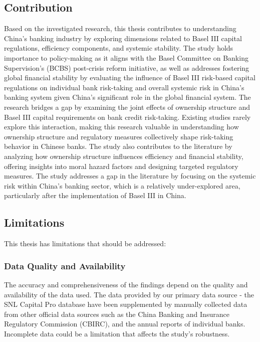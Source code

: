 \documentclass[
  12pt,
  a4paper,
]{scrreprt}
\begin{document}
\subsection{Contribution}\label{contribution}

Based on the investigated research, this thesis contributes to
understanding China's banking industry by exploring dimensions related
to Basel III capital regulations, efficiency components, and systemic
stability. The study holds importance to policy-making as it aligns with
the Basel Committee on Banking Supervision's (BCBS) post-crisis reform
initiative, as well as addresses fostering global financial stability by
evaluating the influence of Basel III risk-based capital regulations on
individual bank risk-taking and overall systemic risk in China's banking
system given China's significant role in the global financial system.
The research bridges a gap by examining the joint effects of ownership
structure and Basel III capital requirements on bank credit risk-taking.
Existing studies rarely explore this interaction, making this research
valuable in understanding how ownership structure and regulatory
measures collectively shape risk-taking behavior in Chinese banks. The
study also contributes to the literature by analyzing how ownership
structure influences efficiency and financial stability, offering
insights into moral hazard factors and designing targeted regulatory
measures. The study addresses a gap in the literature by focusing on the
systemic risk within China's banking sector, which is a relatively
under-explored area, particularly after the implementation of Basel III
in China.

\subsection{Limitations}\label{limitations}

This thesis has limitations that should be addressed:

\subsubsection{Data Quality and
Availability}\label{data-quality-and-availability}

The accuracy and comprehensiveness of the findings depend on the quality
and availability of the data used. The data provided by our primary data
source - the SNL Capital Pro database have been supplemented by manually
collected data from other official data sources such as the China
Banking and Insurance Regulatory Commission (CBIRC), and the annual
reports of individual banks. Incomplete data could be a limitation that
affects the study's robustness.
\end{document}
